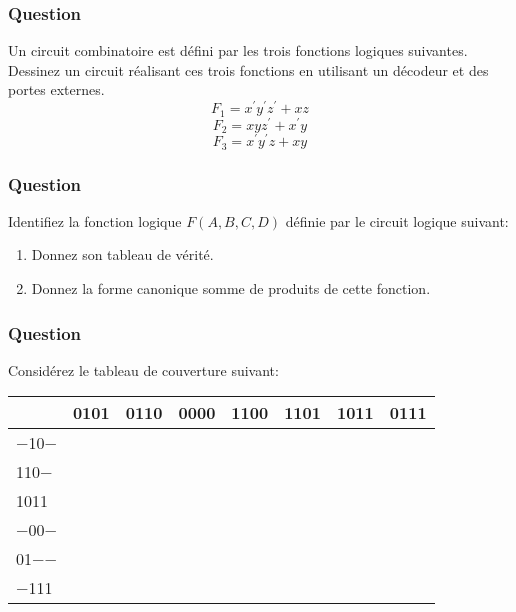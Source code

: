 \documentclass[11pt]{article}
\begin{document}
\subsubsection*{Question}
\label{sec:org11a7eb0}
Un circuit combinatoire est défini par les trois fonctions logiques
  suivantes. Dessinez un circuit réalisant ces trois fonctions en
  utilisant un décodeur et des portes externes.
  $$
    F_1  = x^{\prime} y^{\prime} z^{\prime} + xz 
    $$
  $$
    F_2  = x y z^{\prime} + x^{\prime} y 
    $$
  $$
    F_3  = x^{\prime} y^{\prime} z + x y
    $$

\subsubsection*{Question}
\label{sec:org8a67f7b}
 Identifiez la fonction logique \(F(A,B,C,D)\) définie par le circuit
   logique suivant:
\begin{center}

\end{center}
\begin{enumerate}
\item Donnez son tableau de vérité.

\item Donnez la forme canonique somme de produits de cette fonction.
\end{enumerate}

\subsubsection*{Question}
\label{sec:org26856a6}
Considérez le tableau de couverture suivant:

\begin{center}
\begin{tabular}{lrrrrrrr}
 & 0101 & 0110 & 0000 & 1100 & 1101 & 1011 & 0111\\[0pt]
\hline
−10− &  &  &  &  &  &  & \\[0pt]
110− &  &  &  &  &  &  & \\[0pt]
1011 &  &  &  &  &  &  & \\[0pt]
−00− &  &  &  &  &  &  & \\[0pt]
01−− &  &  &  &  &  &  & \\[0pt]
−111 &  &  &  &  &  &  & \\[0pt]
\end{tabular}
\end{center}
\end{document}

